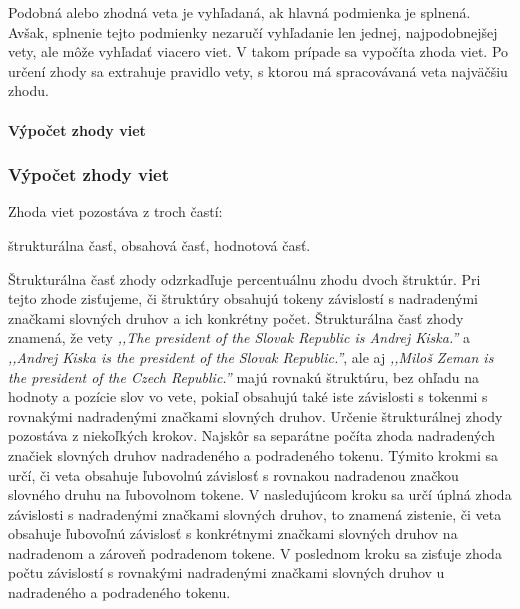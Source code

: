 Podobná alebo zhodná veta je vyhľadaná, ak hlavná podmienka je splnená. Avšak, splnenie tejto podmienky nezaručí vyhľadanie len jednej, najpodobnejšej vety, ale môže vyhľadať viacero viet. V takom prípade sa vypočíta zhoda viet. Po určení zhody sa extrahuje pravidlo vety, s ktorou má spracovávaná veta najväčšiu zhodu.

%
%
{
	\paragraph{Výpočet zhody viet}
}
{
	\subsubsection{Výpočet zhody viet}
}
\label{paragraph:sentences_match}

Zhoda viet pozostáva z troch častí:
\begin{my_itemize}
	\myitem štrukturálna časť,
	\myitem obsahová časť,
	\myitem hodnotová časť.
\end{my_itemize}

Štrukturálna časť zhody odzrkadľuje percentuálnu zhodu dvoch štruktúr. Pri tejto zhode zisťujeme, či štruktúry obsahujú tokeny závislostí s nadradenými značkami slovných druhov a ich konkrétny počet. Štrukturálna časť zhody znamená, že vety \textit{,,The president of the Slovak Republic is Andrej Kiska.''} a \textit{,,Andrej Kiska is the president of the Slovak Republic.''}, ale aj \textit{,,Miloš Zeman is the president of the Czech Republic.''} majú rovnakú štruktúru, bez ohľadu na hodnoty a pozície slov vo vete, pokiaľ obsahujú také iste závislosti s tokenmi s rovnakými nadradenými značkami slovných druhov. Určenie štrukturálnej zhody pozostáva z niekoľkých krokov. Najskôr sa separátne počíta zhoda nadradených značiek slovných druhov nadradeného a podradeného tokenu. Týmito krokmi sa určí, či veta obsahuje ľubovolnú závislosť s rovnakou nadradenou značkou slovného druhu na ľubovolnom tokene. V nasledujúcom kroku sa určí úplná zhoda závislosti s nadradenými značkami slovných druhov, to znamená zistenie, či veta obsahuje ľubovoľnú závislosť s konkrétnymi značkami slovných druhov na nadradenom a zároveň podradenom tokene. V poslednom kroku sa zisťuje zhoda počtu závislostí s rovnakými nadradenými značkami slovných druhov u nadradeného a podradeného tokenu. \\

